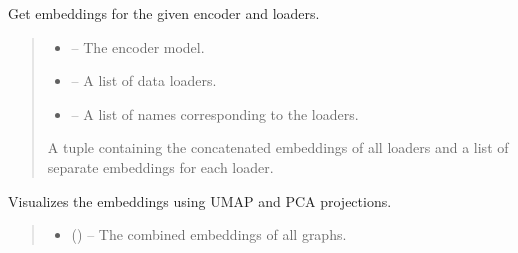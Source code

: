 \documentclass[letterpaper,10pt,english]{sphinxhowto}
\begin{document}
\begin{fulllineitems}
\begin{fulllineitems}
\end{fulllineitems}


\begin{fulllineitems}
\label{\detokenize{top:id3}}
\pysigstartsignatures
{}
\pysigstopsignatures
\sphinxAtStartPar
Get embeddings for the given encoder and loaders.
\begin{quote}\begin{description}
\begin{itemize}
\item {} 
\sphinxAtStartPar
{} – The encoder model.

\item {} 
\sphinxAtStartPar
{} – A list of data loaders.

\item {} 
\sphinxAtStartPar
{} – A list of names corresponding to the loaders.

\end{itemize}

\sphinxAtStartPar
A tuple containing the concatenated embeddings of all loaders and a list of separate embeddings for each loader.

\end{description}\end{quote}

\end{fulllineitems}


\begin{fulllineitems}
\label{\detokenize{top:id4}}
\pysigstartsignatures
{}
\pysigstopsignatures
\sphinxAtStartPar
Visualizes the embeddings using UMAP and PCA projections.
\begin{quote}\begin{description}
\begin{itemize}
\item {} 
\sphinxAtStartPar
{} () – The combined embeddings of all graphs.


\end{itemize}
\end{description}
\end{quote}
\end{fulllineitems}
\end{fulllineitems}
\end{document}
